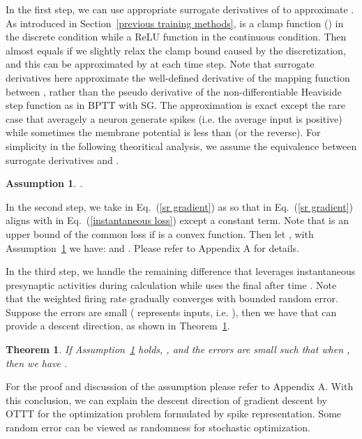 \documentclass{article}
\begin{document}
In the first step, we can use appropriate surrogate derivatives of  to approximate . As introduced in Section~\ref{previous training methods},  is a clamp function () in the discrete condition while a ReLU function in the continuous condition. Then  almost equals  if we slightly relax the clamp bound caused by the discretization, and this can be approximated by  at each time step. 
Note that surrogate derivatives here approximate the well-defined derivative of the mapping function between , rather than the pseudo derivative of the non-differentiable Heaviside step function as in BPTT with SG. The approximation is exact except the rare case that averagely a neuron generate spikes (i.e. the average input is positive) while sometimes the membrane potential is less than  (or the reverse). For simplicity in the following theoritical analysis, we assume the equivalence between surrogate derivatives and .
\newtheorem{assumption}{\bf Assumption}
\begin{assumption}\label{assumption1}
.
\end{assumption}

In the second step, we take  in Eq.~(\ref{sr gradient}) as  so that  in Eq.~(\ref{sr gradient}) aligns with  in Eq.~(\ref{instantaneous loss}) except a constant term. Note that  is an upper bound of the common loss  if  is a convex function. 
Then let , with Assumption~\ref{assumption1} we have:  and . Please refer to Appendix A for details.

In the third step, we handle the remaining difference that  leverages instantaneous presynaptic activities  during calculation while  uses the final  after time . Note that the weighted firing rate gradually converges  with bounded random error. Suppose the errors  are small ( represents inputs, i.e. ), then we have that  can provide a descent direction, as shown in Theorem~\ref{thm_feedforward}. 
\newtheorem{thm}{\bf Theorem}
\begin{thm}\label{thm_feedforward}
If Assumption~\ref{assumption1} holds, , and the errors  are small such that  when , then we have .
\end{thm}
For the proof and discussion of the assumption please refer to Appendix A. 
With this conclusion, we can explain the descent direction of gradient descent by OTTT for the optimization problem formulated by spike representation. Some random error can be viewed as randomness for stochastic optimization.
\end{document}
